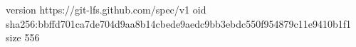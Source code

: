 version https://git-lfs.github.com/spec/v1
oid sha256:bbffd701ca7de704d9aa8b14cbede9aedc9bb3ebdc550f954879c11e9410b1f1
size 556
